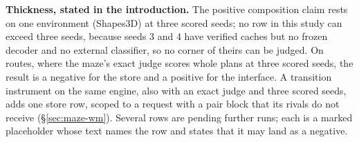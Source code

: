 \documentclass{article} %
\begin{document}
\noindent\textbf{Thickness, stated in the introduction.} The positive composition claim rests
on one environment (Shapes3D) at three scored seeds; no row in this study can exceed three
seeds, because seeds 3 and 4 have verified caches but no frozen decoder and no external
classifier, so no corner of theirs can be judged. %
On routes, where the maze's exact judge scores whole plans at three scored seeds, the result is
a negative for the store and a positive for the interface. A transition instrument on the same
engine, also with an exact judge and three scored seeds, adds one store row, scoped to a request
with a pair block that its rivals do not receive (\S\ref{sec:maze-wm}). Several rows are pending further runs; each is a
marked placeholder whose text names the row and states that it may land as a negative.

\end{document}
